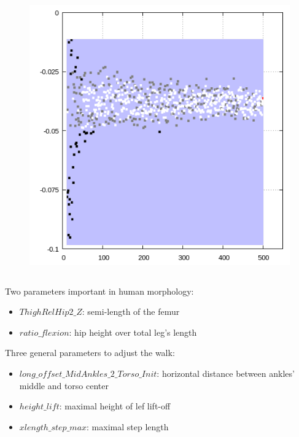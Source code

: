 \documentclass{beamer}
\begin{document}
\begin{frame}
\begin{columns}
\begin{column}{.45\textwidth}
\begin{figure}[!t]
      \includegraphics[scale=0.28]{figure/img1-grid.png}
      \label{fig4}
    \end{figure}
\end{column}%
\end{columns}
\end{frame}

\begin{frame}
\footnotesize{
Two parameters important in human morphology:
\begin{itemize}
\item $ThighRelHip2\_Z$: semi-length of the femur
\item $ratio\_flexion$: hip height over total leg's length
\end{itemize}
Three general parameters to adjust the walk: 
\begin{itemize}
\item $long\_offset\_MidAnkles\_2\_Torso\_Init$: horizontal distance between ankles' middle and torso center
\item $height\_lift$: maximal height of lef lift-off
\item $xlength\_step\_max$: maximal step length
\end{itemize}
}
\end{frame}
\end{document}
